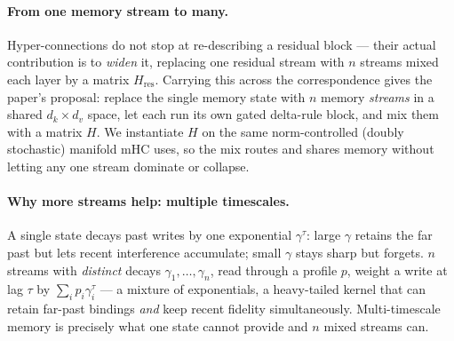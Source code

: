 \documentclass[11pt,letterpaper,logo]{yalearxiv}
\newcommand{\Hres}{H_{\mathrm{res}}}
\begin{document}
\paragraph{From one memory stream to many.} Hyper-connections do not stop at
re-describing a residual block --- their actual contribution is to \emph{widen}
it, replacing one residual stream with $n$ streams mixed each layer by a matrix
$\Hres$. Carrying this across the correspondence gives the paper's proposal:
replace the single memory state with $n$ memory \emph{streams} in a shared
$d_k\times d_v$ space, let each run its own gated delta-rule block, and mix them
with a matrix $H$. We instantiate $H$ on the same norm-controlled (doubly
stochastic) manifold mHC uses, so the mix routes and shares memory without letting
any one stream dominate or collapse.

\paragraph{Why more streams help: multiple timescales.} A single state decays past
writes by one exponential $\gamma^{\tau}$: large $\gamma$ retains the far past but
lets recent interference accumulate; small $\gamma$ stays sharp but forgets. $n$
streams with \emph{distinct} decays $\gamma_1,\dots,\gamma_n$, read through a
profile $p$, weight a write at lag $\tau$ by $\sum_i p_i \gamma_i^{\tau}$ --- a
mixture of exponentials, a heavy-tailed kernel that can retain far-past bindings
\emph{and} keep recent fidelity simultaneously. Multi-timescale memory is
precisely what one state cannot provide and $n$ mixed streams can.
\end{document}
